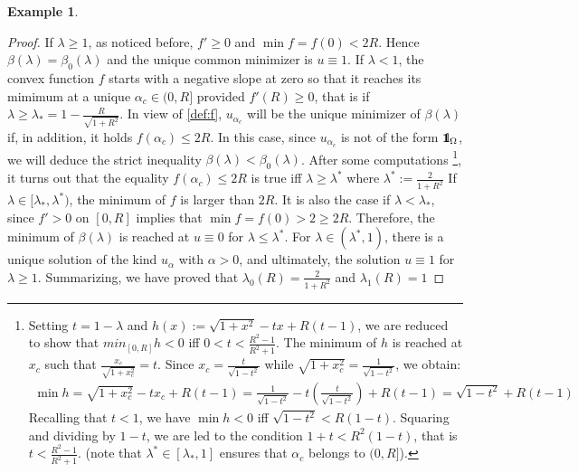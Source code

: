 \documentclass[reqno,11pt]{amsart}
\theoremstyle{definition}
\newtheorem{example}[theorem]{Example}
\numberwithin{equation}{section}
\newcommand{\1}{{{\bf 1}\kern-0,28em\rm l}}
\newcommand{\one}{{{\bf 1}\kern-0,28em\rm l}}
\newcommand{\med}{\medskip\noindent}
\def\a{\alpha}
\def\O{\Omega}
\def\l{\lambda}
\begin{document}
\begin{example}
\begin{proof}
\med {\bf Case $R> 1.$\ } 
If $\l\ge 1$, as noticed before, $f'\ge 0$ and $\min f= f(0)<2R$.
Hence $\beta(\l)=\beta_0(\l)$ and the unique common minimizer is $u\equiv 1$. 
If $\l<1$, the convex function $f$ starts with a negative slope at zero so that it reaches its mimimum at a unique  $ \a_c\in (0,R]$ provided
 $f'(R) \ge 0$, that is if $\l \ge \l_* = 1 -\frac{R}{\sqrt{1+R^2}}$. 
 In view of \eqref{def:f},   $u_{\a_c}$ will be the unique minimizer of $\beta(\l)$
 if, in addition, it holds $f(\a_c)\le 2R$. In this case, since  $u_{\a_c}$ is  not of the form $\one_\O$,
we  will deduce the strict inequality $\beta(\l) <\beta_0(\l)$.
After some computations  \footnote{Setting $t=1-\l$ and $h(x) := \sqrt{1+x^2} - t x + R(t-1)$, we are reduced  to 
show that $min_{[0,R]} h <0$ iff $0 < t < \frac{R^2 - 1}{R^2 + 1}$. The minimum of $h$ is reached
at $x_c$ such that $\frac{x_c}{\sqrt{1+x_c^2}} = t$. 
Since $x_c = \frac{t}{\sqrt{1-t^2}}$ while $ \sqrt{1+x_c^2} = \frac{1}{\sqrt{1-t^2}}$, we obtain:
\begin{align*} \min h = \sqrt{1+x_c^2} - t x_c + R(t-1)=
 \frac{1}{\sqrt{1-t^2}} - t \left( \frac{t}{\sqrt{1-t^2}} \right) + R(t-1) = \sqrt{1-t^2} + R(t-1)
\end{align*} 
Recalling that $t<1$, we have $\min h<0$ iff $\sqrt{1-t^2} < R(1-t)$. Squaring and  dividing by $1-t$,
we are led to the condition  $1+t < R^2(1-t)$, that is $ t < \frac{R^2 - 1}{R^2 + 1}$.
 (note that $\l^*\in [\l_*,1]$ ensures that $\a_c$ belongs to $(0,R]$).}, it turns out that  the equality   $f(\a_c)\le 2R$ is true iff $\l \ge \l^*$ where $\l^*:=\frac2{1+R^2}$ If $\l\in [\l_* , \l^*)$, the minimum of $f$ is larger  than $2R$. It is also the case if 
 $\l< \l_*$, since $f'>0$ on $[0,R] $ implies that  $\min f=f(0)> 2  \ge 2R$.
 Therefore, the minimum of  $\beta(\l)$ is reached at $u\equiv 0$ for $\l\le \l^*$. For $\l \in (\l^*,1)$, there is a unique 
 solution of the kind $u_{\a}$ with $\a>0$, and ultimately,  the solution $u\equiv 1$ for $\l\ge 1$.  
    Summarizing, we have proved that $\l_0(R) =\frac2{1+R^2}$ and $\l_1(R)=1$
 \end{proof} 
 
 









 



\end{example}
\end{document}
